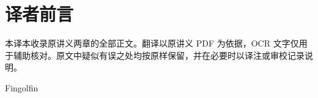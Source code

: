 \documentclass[BookTitleCN={模形式及其算术性质},OriginalAuthor={Jean-François Dat},OriginalYear={2014-2015},Translator={Fingolfin},TranslationDate={2026年10月24日},ModelUsed={Codex},BibStyle=numeric]{mathtranslation}
\begin{document}
\hypersetup{pageanchor=false}
\makecover
\cleardoublepage
\hypersetup{pageanchor=true}
\frontmatter
\chapter*{译者前言}
本译本收录原讲义两章的全部正文。翻译以原讲义 PDF 为依据，OCR 文字仅用于辅助核对。原文中疑似有误之处均按原样保留，并在必要时以译注或审校记录说明。
\par\medskip\hfill Fingolfin
\makecontents
\mainmatter







\backmatter
\printterminology
\end{document}
